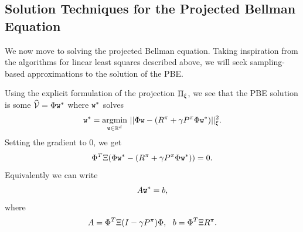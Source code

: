 \subsection{Solution Techniques for the Projected Bellman Equation}
We now move to solving the projected Bellman equation. Taking inspiration from the algorithms for linear least squares described above, we will seek sampling-based approximations to the solution of the PBE.

Using the explicit formulation of the projection $\Pi_\xi$, we see that the PBE solution is some $\widehat{\mathcal{V}} = \Phi {\tt w}^*$ where ${\tt w}^*$ solves
$${\tt w}^* = \underset{{{\tt w} \in \mathbb{R}^d}}{\operatorname{argmin}} \ ||\Phi {\tt w} - (R^\pi+\gamma P^\pi\Phi {\tt w}^*)||_\xi^2.$$
Setting the gradient to $0$, we get
$$\Phi^T \Xi (\Phi {\tt w}^* - (R^\pi+\gamma P^\pi \Phi {\tt w}^*)) = 0.$$
Equivalently we can write
$$A {\tt w}^* = b,$$
where
$$A = \Phi^T \Xi(I-\gamma P^\pi) \Phi, \ \ b = \Phi^T\Xi R^\pi.$$

